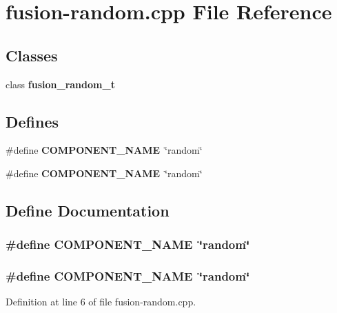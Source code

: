 \section{fusion-random.cpp File Reference}
\label{fusion-random_8cpp}
\subsection*{Classes}
\begin{CompactItemize}
\item 
class {\bf fusion\_\-random\_\-t}
\end{CompactItemize}
\subsection*{Defines}
\begin{CompactItemize}
\item 
\#define {\bf COMPONENT\_\-NAME}~\char`\"{}random\char`\"{}
\item 
\#define {\bf COMPONENT\_\-NAME}~\char`\"{}random\char`\"{}
\end{CompactItemize}


\subsection{Define Documentation}
\subsubsection[{COMPONENT\_\-NAME}]{\setlength{\rightskip}{0pt plus 5cm}\#define COMPONENT\_\-NAME~\char`\"{}random\char`\"{}}\label{zesto-bpred_8cpp_9146ade7ce24e3db226a973a59063892}


\subsubsection[{COMPONENT\_\-NAME}]{\setlength{\rightskip}{0pt plus 5cm}\#define COMPONENT\_\-NAME~\char`\"{}random\char`\"{}}\label{fusion-random_8cpp_9146ade7ce24e3db226a973a59063892}




Definition at line 6 of file fusion-random.cpp.